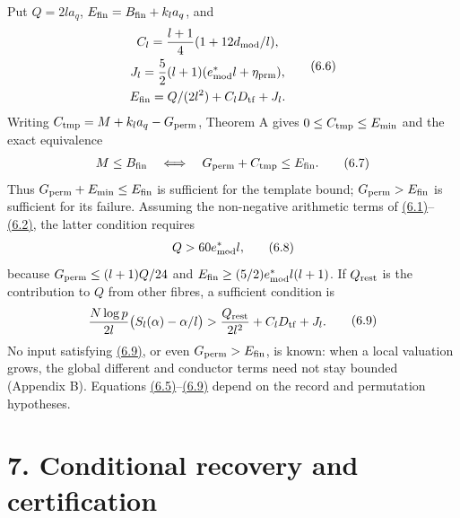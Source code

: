 \documentclass[11pt,a4paper]{amsart}
\begin{document}
Put $Q=2la_q$, $E_{\rm fin}=B_{\rm fin}+k_la_q$, and
\begin{equation}
\begin{gathered}
C_l=\frac{l+1}{4}(1+12d_{\rm mod}/l),\\ J_l=\frac52(l+1)(e^*_{\rm mod}l+\eta_{\rm prm}),\\ E_{\rm fin}=Q/(2l^2)+C_lD_{\rm tf}+J_l.
\end{gathered}
\tag{6.6}\label{eq:6.6}
\end{equation}
Writing $C_{\rm tmp}=M+k_la_q-G_{\rm perm}$, Theorem A gives $0\le C_{\rm tmp}\le E_{\min}$ and the exact equivalence
\begin{equation}
\begin{gathered}
M\le B_{\rm fin}\quad\Longleftrightarrow\quad
G_{\rm perm}+C_{\rm tmp}\le E_{\rm fin}.
\end{gathered}
\tag{6.7}\label{eq:6.7}
\end{equation}
Thus $G_{\rm perm}+E_{\min}\le E_{\rm fin}$ is sufficient for the template bound; $G_{\rm perm}>E_{\rm fin}$ is sufficient for its failure. Assuming the non-negative arithmetic terms of \hyperref[eq:6.1]{(6.1)}--\hyperref[eq:6.2]{(6.2)}, the latter condition requires
\begin{equation}
\begin{gathered}
Q>60e^*_{\rm mod}l,
\end{gathered}
\tag{6.8}\label{eq:6.8}
\end{equation}
because $G_{\rm perm}\le(l+1)Q/24$ and $E_{\rm fin}\ge(5/2)e^*_{\rm mod}l(l+1)$. If $Q_{\rm rest}$ is the contribution to $Q$ from other fibres, a sufficient condition is
\begin{equation}
\begin{gathered}
{N\log p\over2l}\bigl(S_l(\alpha)-\alpha/l\bigr)
>{Q_{\rm rest}\over2l^2}+C_lD_{\rm tf}+J_l.
\end{gathered}
\tag{6.9}\label{eq:6.9}
\end{equation}
No input satisfying \hyperref[eq:6.9]{(6.9)}, or even $G_{\rm perm}>E_{\rm fin}$, is known: when a local valuation grows, the global different and conductor terms need not stay bounded (Appendix B). Equations \hyperref[eq:6.5]{(6.5)}--\hyperref[eq:6.9]{(6.9)} depend on the record and permutation hypotheses.


\section*{7. Conditional recovery and certification}
\end{document}
